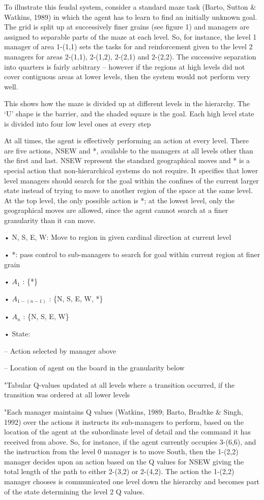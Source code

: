 \documentclass[english]{article}
\begin{document}
To illustrate this feudal system, consider a standard maze task (Barto, Sutton \&
Watkins, 1989) in which the agent has to learn to find an initially unknown goal.
The grid is split up at successively finer grains (see figure 1) and managers are
assigned to separable parts of the maze at each level. So, for instance, the level 1
manager of area 1-(1,1) sets the tasks for and reinforcement given to the level 2
managers for areas 2-(1,1), 2-(1,2), 2-(2,1) and 2-(2,2). The successive separation
into quarters is fairly arbitrary – however if the regions at high levels did not cover
contiguous areas at lower levels, then the system would not perform very well.



This shows how the maze is divided up at
different levels in the hierarchy. The ‘U' shape is the barrier, and the shaded square
is the goal. Each high level state is divided into four low level ones at every step

At all times, the agent is effectively performing an action at every level. There are five actions, NSEW and *, available to the managers at all levels other than the
first and last. NSEW represent the standard geographical moves and * is a special
action that non-hierarchical systems do not require. It specifies that lower level
managers should search for the goal within the confines of the current larger state
instead of trying to move to another region of the space at the same level. At the
top level, the only possible action is *; at the lowest level, only the geographical
moves are allowed, since the agent cannot search at a finer granularity than it can
move.


• N, S, E, W: Move to region in given
cardinal direction at current level

• *: pass control to sub-managers to
search for goal within current region
at finer grain

• $A_1$ : \{*\}

• $A_{1-(n-1)}$ : \{N, S, E, W, *\}

• $A_n$ : \{N, S, E, W\}

• State:

– Action selected by manager above

– Location of agent on the board in the
granularity below

"Tabular Q-values updated at
all levels where a transition
occurred, if the transition
was ordered at all lower
levels

"Each manager maintains Q values (Watkins, 1989; Barto, Bradtke \& Singh, 1992)
over the actions it instructs its sub-managers to perform, based on the location of
the agent at the subordinate level of detail and the command it has received from
above. So, for instance, if the agent currently occupies 3-(6,6), and the instruction
from the level 0 manager is to move South, then the 1-(2,2) manager decides upon
an action based on the Q values for NSEW giving the total length of the path to
either 2-(3,2) or 2-(4,2). The action the 1-(2,2) manager chooses is communicated
one level down the hierarchy and becomes part of the state determining the level 2
Q values.
\end{document}
